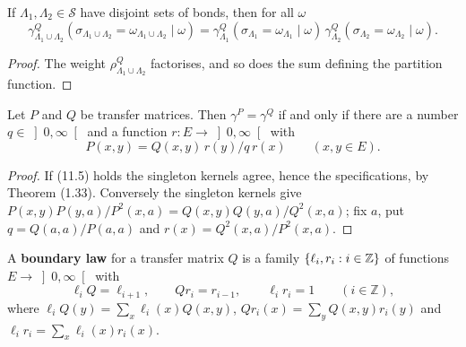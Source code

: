 \begin{proposition}[Georgii (11.3)]
    \label{prop:bl-11-3}
    \leanok

    If $\Lambda_1, \Lambda_2 \in \mathcal S$ have disjoint sets of bonds, then for all $\omega$
    \[
        \gamma^Q_{\Lambda_1 \cup \Lambda_2}(\sigma_{\Lambda_1 \cup \Lambda_2} = \omega_{\Lambda_1 \cup \Lambda_2} \mid \omega)
        = \gamma^Q_{\Lambda_1}(\sigma_{\Lambda_1} = \omega_{\Lambda_1} \mid \omega)\,
          \gamma^Q_{\Lambda_2}(\sigma_{\Lambda_2} = \omega_{\Lambda_2} \mid \omega).
    \]
\end{proposition}
\begin{proof}
    \leanok
    The weight $\rho^Q_{\Lambda_1 \cup \Lambda_2}$ factorises, and so does the sum defining the
    partition function.
\end{proof}

\begin{remark}[Georgii (11.4)]
    \label{rmk:bl-11-4}
    \leanok

    Let $P$ and $Q$ be transfer matrices. Then $\gamma^P = \gamma^Q$ if and only if there are a
    number $q \in \left]0,\infty\right[$ and a function $r \colon E \to \left]0,\infty\right[$ with
    \[
        P(x,y) = Q(x,y)\, r(y) / q\, r(x) \qquad (x, y \in E). \tag{11.5}
    \]
\end{remark}
\begin{proof}
    \leanok
    If (11.5) holds the singleton kernels agree, hence the specifications, by Theorem (1.33).
    Conversely the singleton kernels give $P(x,y)P(y,a)/P^2(x,a) = Q(x,y)Q(y,a)/Q^2(x,a)$; fix
    $a$, put $q = Q(a,a)/P(a,a)$ and $r(x) = Q^2(x,a)/P^2(x,a)$.
\end{proof}

\begin{definition}
    \label{def:bl-boundary-law}
    \leanok

    A \textbf{boundary law} for a transfer matrix $Q$ is a family
    $\left\{ \ell_i, r_i : i \in \mathbb{Z} \right\}$ of functions $E \to \left]0,\infty\right[$ with
    \[
        \ell_i Q = \ell_{i+1}, \qquad Q r_i = r_{i-1}, \qquad \ell_i r_i = 1 \qquad (i \in \mathbb{Z}),
    \]
    where $\ell_i Q(y) = \sum_x \ell_i(x) Q(x,y)$, $Q r_i(x) = \sum_y Q(x,y) r_i(y)$ and
    $\ell_i r_i = \sum_x \ell_i(x) r_i(x)$.
\end{definition}

